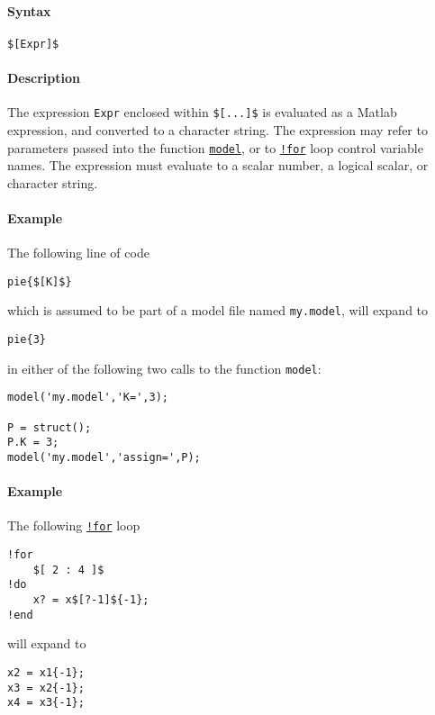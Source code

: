 


	\paragraph{Syntax}

\begin{verbatim}
$[Expr]$
\end{verbatim}

\paragraph{Description}

The expression \texttt{Expr} enclosed within \texttt{\${[}...{]}\$} is
evaluated as a Matlab expression, and converted to a character string.
The expression may refer to parameters passed into the function
\href{model/model}{\texttt{model}}, or to
\href{modellang/for}{\texttt{!for}} loop control variable names. The
expression must evaluate to a scalar number, a logical scalar, or
character string.

\paragraph{Example}

The following line of code

\begin{verbatim}
pie{$[K]$}
\end{verbatim}

which is assumed to be part of a model file named \texttt{my.model},
will expand to

\begin{verbatim}
pie{3}
\end{verbatim}

in either of the following two calls to the function \texttt{model}:

\begin{verbatim}
model('my.model','K=',3);

P = struct();
P.K = 3;
model('my.model','assign=',P);
\end{verbatim}

\paragraph{Example}

The following \href{modellang/for}{\texttt{!for}} loop

\begin{verbatim}
!for
    $[ 2 : 4 ]$
!do
    x? = x$[?-1]${-1};
!end
\end{verbatim}

will expand to

\begin{verbatim}
x2 = x1{-1};
x3 = x2{-1};
x4 = x3{-1};
\end{verbatim}


